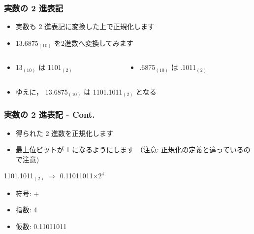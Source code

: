\begin{frame}
\frametitle{実数の 2 進表記}
  \begin{itemize}
\item 実数も 2 進表記に変換した上で正規化します
\item 13.6875$_{(10)}$ を2進数へ変換してみます
  \end{itemize}
  \begin{center}
   \begin{example}
     \begin{columns}[t]
       \begin{column}{4.5cm}
         \begin{itemize}
\item 13$_{(10)}$ は 1101$_{(2)}$
         \end{itemize}
       \end{column}
     \begin{column}{4.5cm}
     \begin{itemize}
\item .6875$_{(10)}$ は .1011$_{(2)}$
     \end{itemize}
      \end{column}
     \end{columns}
     \begin{itemize}
\item ゆえに， 13.6875$_{(10)}$ は 1101.1011$_{(2)}$ となる 
     \end{itemize}
   \end{example}
  \end{center}
\end{frame}
\begin{frame}
\frametitle{実数の 2 進表記 - Cont.}
  \begin{itemize}
\item 得られた 2 進数を正規化します
\item 最上位ビットが 1 になるようにします （注意: 正規化の定義と違っているので注意)
  \end{itemize}
  \begin{center}
    \begin{example}[1101.1011$_{(2)}$ を正規化]
1101.1011$_{(2)}$ \(\Rightarrow\) 0.11011011\(\times 2^4\)
      \begin{itemize}
\item 符号: +
\item 指数: 4
\item 仮数: 0.11011011
      \end{itemize}
    \end{example}
  \end{center}
\end{frame}
